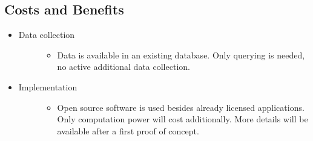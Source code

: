 \documentclass[letterpaper,10pt,english]{sphinxmanual}
\begin{document}
\subsection{Costs and Benefits}
\label{\detokenize{business_understanding:costs-and-benefits}}\begin{itemize}
\item {} \begin{description}
\item[{Data collection}] \leavevmode\begin{itemize}
\item {} 
Data is available in an existing database. Only querying is needed, no active additional data collection.

\end{itemize}

\end{description}

\item {} \begin{description}
\item[{Implementation}] \leavevmode\begin{itemize}
\item {} 
Open source software is used besides already licensed applications. Only computation power will cost additionally. More details will be available after a first proof of concept.

\end{itemize}

\end{description}

\end{itemize}
\end{document}
